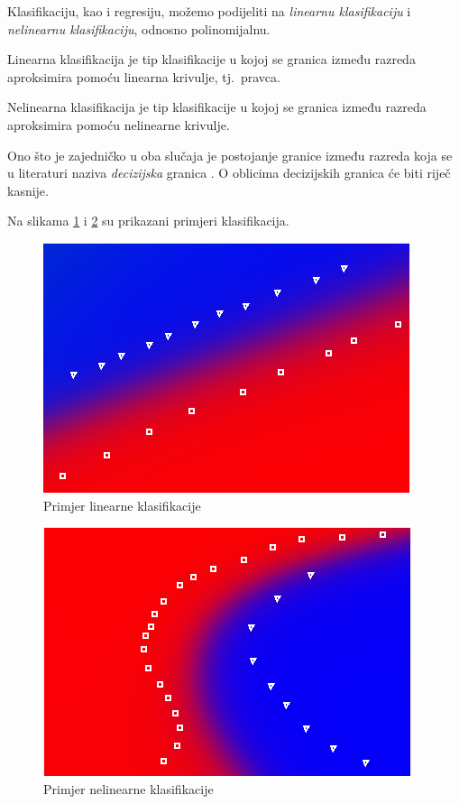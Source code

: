 \documentclass[times, utf8, zavrsni]{fer}
\begin{document}
\bigskip

Klasifikaciju, kao i regresiju, možemo podijeliti na \textit{linearnu klasifikaciju} i \textit{nelinearnu klasifikaciju}, odnosno polinomijalnu.

Linearna klasifikacija  je tip klasifikacije u kojoj se granica između razreda aproksimira pomoću linearna krivulje, tj.\ pravca.

Nelinearna klasifikacija  je tip klasifikacije u kojoj se granica između razreda aproksimira pomoću nelinearne krivulje.

Ono što je zajedničko u oba slučaja je postojanje granice između razreda koja se u literaturi naziva \textit{decizijska} granica \citep{cupicANN}. O oblicima decizijskih granica će biti riječ kasnije.

Na slikama \ref{fig:linear-classification} i \ref{fig:non-linear-classification} su prikazani primjeri klasifikacija.

\begin{figure}[H]
    \centering
    \includegraphics[scale=0.8]{img/linear-classification.png}
    \caption[Caption for LOF]{Primjer linearne klasifikacije\footnotemark}
    \label{fig:linear-classification}
\end{figure}

\begin{figure}[H]
    \centering
    \includegraphics[scale=0.8]{img/non-linear-classification.png}
    \caption[Caption for LOF]{Primjer nelinearne klasifikacije\footnotemark}
    \label{fig:non-linear-classification}
\end{figure}
\end{document}
